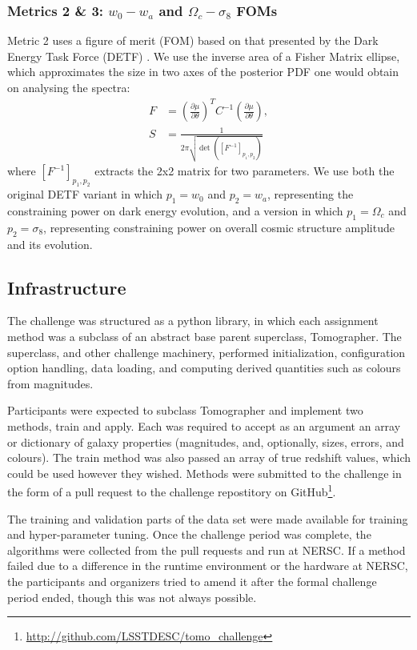 \documentclass[twocolumn,twocolappendix]{aastex63}
\begin{document}
\subsubsection{Metrics 2 \& 3: $w_{0}-w_{a}$ and $\Omega_c-\sigma_8$ FOMs}

Metric 2 uses a figure of merit (FOM) based on that presented by the Dark Energy Task Force (DETF) \citep{detf}.  We 
use the inverse area of a Fisher Matrix ellipse, which approximates the size in two axes 
of the posterior PDF one would obtain on analysing the spectra:
\begin{align}
    F &= \left( \frac{\partial \mu}{\partial \theta} \right)^T C^{-1} \left( \frac{\partial \mu}{\partial \theta} \right), \\
    S &= \frac{1}{2 \pi \sqrt{\det{([F^{-1}]_{p_1, p_2})}}}
\label{eq:fom}
\end{align}
where $[F^{-1}]_{p_1, p_2}$ extracts the 2x2 matrix for two parameters.  We use both the original
DETF variant in which $p_1 = w_0$ and $p_2 = w_a$, representing the constraining power on dark energy 
evolution, and a version in which $p_1 = \Omega_c$ and $p_2 = \sigma_8$, representing constraining
power on overall cosmic structure amplitude and its evolution.

\subsection{Infrastructure}

The challenge was structured as a python library, in which each assignment
method was a subclass of an abstract base parent superclass, {\sc Tomographer}.
The superclass, and other challenge machinery, performed initialization,
configuration option handling, data loading, and computing derived quantities
such as colours from magnitudes.

Participants were expected to subclass
{\sc Tomographer} and implement two methods, {\sc train} and {\sc apply}.  Each
was required to accept as an argument an array or dictionary of galaxy properties
(magnitudes, and, optionally, sizes, errors, and colours).  The {\sc train} method
was also passed an array of true redshift values, which could be used however they wished.
Methods were submitted to the challenge in the form of a pull request to the challenge
repostitory on GitHub\footnote{\url{http://github.com/LSSTDESC/tomo_challenge}}.

The training and validation parts of the data set were made available for training
and hyper-parameter tuning. Once the challenge period was complete, the algorithms
were collected from the pull requests and run at NERSC. If a method failed due to a difference in the
runtime environment or the hardware at NERSC, the participants and organizers tried
to amend it after the formal challenge period ended, though this was not always possible.
\end{document}
